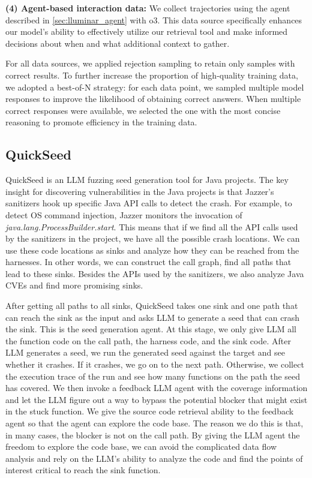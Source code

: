 \textbf{(4) Agent-based interaction data:} We collect trajectories  using the agent described in \ref{sec:lluminar_agent} with o3. This data source specifically enhances our model's ability to effectively utilize our retrieval tool and make informed decisions about when and what additional context to gather.

For all data sources, we applied rejection sampling to retain only samples with correct results. To further increase the proportion of high-quality training data, we adopted a best-of-N strategy: for each data point, we sampled multiple model responses to improve the likelihood of obtaining correct answers. When multiple correct responses were available, we selected the one with the most concise reasoning to promote efficiency in the training data.

\subsection{QuickSeed}
\label{quickseed}
QuickSeed is an LLM fuzzing seed generation tool for Java projects.
The key insight for discovering vulnerabilities in the Java projects is that
Jazzer's sanitizers hook up specific Java API calls to detect the crash.
For example, to detect OS command injection, Jazzer monitors the invocation of \textit{java.lang.ProcessBuilder.start}.
This means that if we find all the API calls used by the sanitizers  in the project, we have all the possible crash locations.
We can use these code locations as sinks and analyze how they can be reached from the harnesses.
In other words, we can construct the call graph, find all paths that lead to these sinks.
Besides the APIs used by the sanitizers, we also analyze Java CVEs and find more promising sinks.

After getting all paths to all sinks, QuickSeed takes one sink and one path that can reach the sink as the input and asks LLM to generate a seed that can crash the sink.
This is the seed generation agent.
At this stage, we only give LLM all the function code on the call path, the harness code, and the sink code.
After LLM generates a seed, we run the generated seed against the target and see whether it crashes.
If it crashes, we go on to the next path.
Otherwise, we collect the execution trace of the run and see how many functions on the path the seed has covered.
We then invoke a feedback LLM agent with the coverage information and let the LLM figure out a way to bypass the potential blocker that might exist in the stuck function.
We give the source code retrieval ability to the feedback agent so that the agent can explore the code base.
The reason we do this is that, in many cases, the blocker is not on the call path.
By giving the LLM agent the freedom to explore the code base, we can avoid the complicated data flow analysis and rely on the LLM's ability to analyze the code and find the points of interest critical to reach the sink function.

